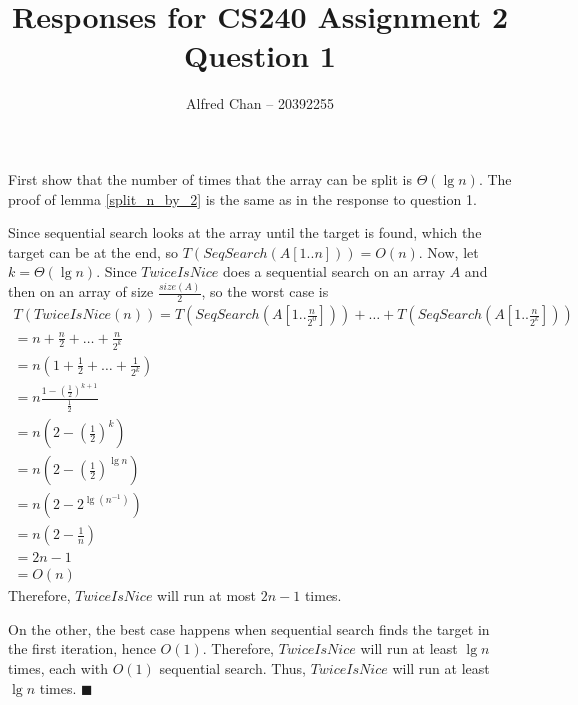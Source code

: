 \documentclass[12pt]{article}
\title{Responses for CS240 Assignment 2 Question 1}
\author{Alfred Chan -- 20392255}
\begin{document}
\maketitle
First show that the number of times that the array can be split is $\Theta(\lg n)$. The proof of lemma \ref{split_n_by_2} is the same as in the response to question 1.

Since sequential search looks at the array until the target is found, which the target can be at the end, so $T(SeqSearch(A[1..n])) = O(n)$.
Now, let $k = \Theta(\lg n)$.
Since $TwiceIsNice$ does a sequential search on an array $A$ and then on an array of size $\frac{size(A)}{2}$, so the worst case is
\begin{gather*}
T(TwiceIsNice(n)) = T(SeqSearch(A[1..\frac{n}{2^0}])) + \dots + T(SeqSearch(A[1 .. \frac{n}{2^k}]))\\
	= n + \frac{n}{2} + \dots + \frac{n}{2^k}\\
	= n (1 + \frac{1}{2} + \dots + \frac{1}{2^k})\\
	= n \frac{1 - (\frac{1}{2})^{k+1}}{\frac{1}{2}}\\
	= n (2 - (\frac{1}{2})^{k})\\
	= n (2 - (\frac{1}{2})^{\lg n})\\
	= n (2 - 2^{\lg (n^{-1})})\\
	= n (2 - \frac{1}{n})\\
	= 2n - 1\\
	= O(n)
\end{gather*}
Therefore, $TwiceIsNice$ will run at most $2n - 1$ times.

On the other, the best case happens when sequential search finds the target in the first iteration, hence $O(1)$.
Therefore, $TwiceIsNice$ will run at least $\lg n$ times, each with $O(1)$ sequential search.
Thus, $TwiceIsNice$ will run at least $\lg n$ times.
\hfill $\blacksquare$
\end{document}
